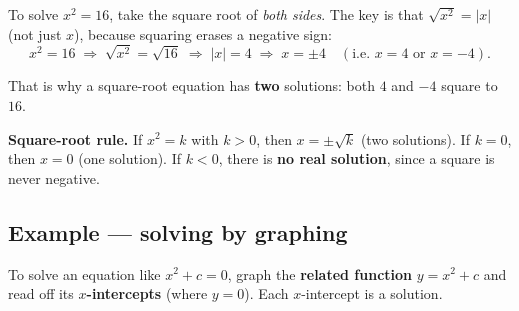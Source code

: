 \documentclass[11pt]{article}
\begin{document}
To solve $x^2 = 16$, take the square root of \emph{both sides}. The key is that
$\sqrt{x^2} = |x|$ (not just $x$), because squaring erases a negative sign:
\[
x^2 = 16 \;\Longrightarrow\; \sqrt{x^2} = \sqrt{16} \;\Longrightarrow\; |x| = 4
\;\Longrightarrow\; x = \pm 4 \quad(\text{i.e. } x = 4 \text{ or } x = -4).
\]

That is why a square-root equation has \textbf{two} solutions: both $4$ and $-4$ square to $16$.

\begin{keybox}
\textbf{Square-root rule.} If $x^2 = k$ with $k > 0$, then $x = \pm\sqrt{k}$ (two solutions).
If $k = 0$, then $x = 0$ (one solution). If $k < 0$, there is \textbf{no real solution},
since a square is never negative.
\end{keybox}

\subsection{Example --- solving by graphing}

To solve an equation like $x^2 + c = 0$, graph the \textbf{related function} $y = x^2 + c$ and
read off its \textbf{$x$-intercepts} (where $y = 0$). Each $x$-intercept is a solution.
\end{document}
